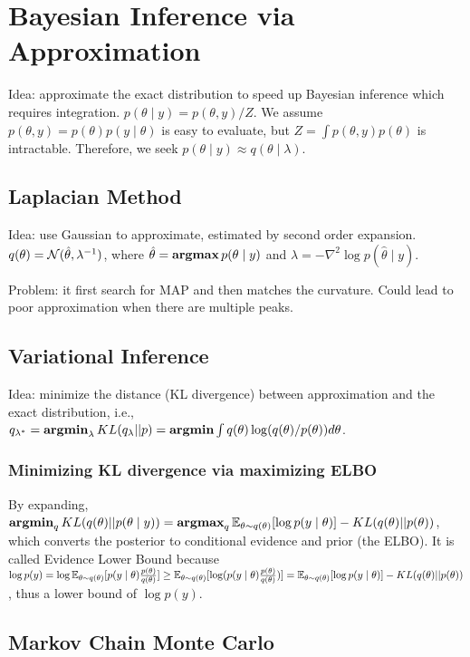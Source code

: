 \section{Bayesian Inference via Approximation}

Idea: approximate the exact distribution to speed up Bayesian inference which requires integration. $p(\theta\mid y) = p(\theta, y)/Z$. We assume $p(\theta, y)=p(\theta)p(y\mid\theta)$ is easy to evaluate, but $Z = \int p(\theta, y)p(\theta)$ is intractable. Therefore, we seek $p(\theta\mid y)\approx q(\theta \mid \lambda)$.

\subsection{Laplacian Method}

Idea: use Gaussian to approximate, estimated by second order expansion. $q(\theta)=\mathcal{N}(\hat{\theta}, \lambda^{-1})$, where $\hat{\theta}=\operatorname{\textbf{argmax}} p(\theta\mid y)$ and $\lambda = -\nabla^2 \log p(\hat{\theta}\mid y)$.

Problem: it first search for MAP and then matches the curvature. Could lead to poor approximation when there are multiple peaks.

\subsection{Variational Inference}

Idea: minimize the distance (KL divergence) between approximation and the exact distribution, i.e., $q_{\lambda^*} = \operatorname{\textbf{argmin}}_\lambda KL(q_\lambda||p) = \operatorname{\textbf{argmin}} \int q(\theta)\log(q(\theta)/p(\theta)) d\theta$.

\subsubsection*{Minimizing KL divergence via maximizing ELBO}
By expanding, $\operatorname{\textbf{argmin}}_q KL(q(\theta)||p(\theta \mid y)) = \operatorname{\textbf{argmax}}_q \mathbb{E}_{\theta\sim q(\theta)} [\log p(y\mid\theta)] - KL(q(\theta)||p(\theta))$, which converts the posterior to conditional evidence and prior (the ELBO). It is called Evidence Lower Bound because $\log p(y) = \log \mathbb{E}_{\theta\sim q(\theta)}[p(y\mid \theta)\frac{p(\theta)}{q(\theta)}] \ge \mathbb{E}_{\theta\sim q(\theta)} [\log(p(y\mid \theta)\frac{p(\theta)}{q(\theta)})] = \mathbb{E}_{\theta\sim q(\theta)} [\log p(y\mid\theta)] - KL(q(\theta)||p(\theta))$, thus a lower bound of $\log p(y)$.


\subsection{Markov Chain Monte Carlo}

